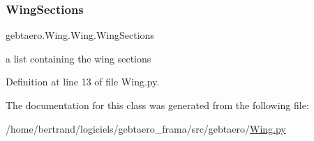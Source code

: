 \subsubsection{\texorpdfstring{Wing\+Sections}{WingSections}}
{\footnotesize\ttfamily gebtaero.\+Wing.\+Wing.\+Wing\+Sections}



a list containing the wing sections 



Definition at line 13 of file Wing.\+py.



The documentation for this class was generated from the following file\+:\begin{DoxyCompactItemize}
\item 
/home/bertrand/logiciels/gebtaero\+\_\+frama/src/gebtaero/\hyperlink{_wing_8py}{Wing.\+py}\end{DoxyCompactItemize}
